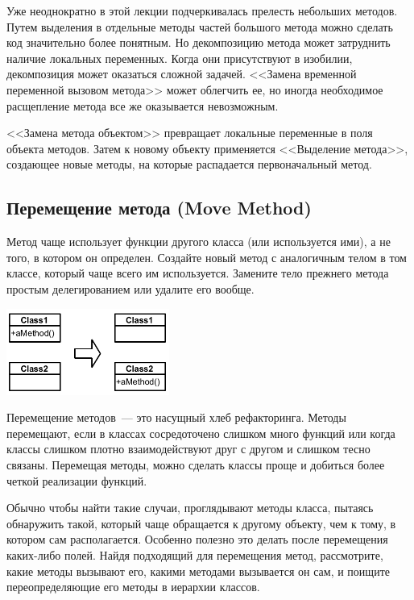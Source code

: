 \documentclass{../../text-style}
\begin{document}
Уже неоднократно в этой лекции подчеркивалась прелесть небольших методов. Путем выделения в отдельные методы частей большого метода можно сделать код значительно более понятным. Но декомпозицию метода может затруднить наличие локальных переменных. Когда они присутствуют в изобилии, декомпозиция может оказаться сложной задачей. <<Замена временной переменной вызовом метода>> может облегчить ее, но иногда необходимое расщепление метода все же оказывается невозможным.

<<Замена метода объектом>> превращает локальные переменные в поля объекта методов. Затем к новому объекту применяется <<Выделение метода>>, создающее новые методы, на которые распадается первоначальный метод.

\subsection{Перемещение метода (Move Method)}

Метод чаще использует функции другого класса (или используется ими), а не того, в котором он определен. Создайте новый метод с аналогичным телом в том классе, который чаще всего им используется. Замените тело прежнего метода простым делегированием или удалите его вообще.

\begin{center}
    \includegraphics[width=0.4\textwidth]{moveMethod.png}
\end{center}

Перемещение методов~--- это насущный хлеб рефакторинга. Методы перемещают, если в классах сосредоточено слишком много функций или когда классы слишком плотно взаимодействуют друг с другом и слишком тесно связаны. Перемещая методы, можно сделать классы проще и добиться более четкой реализации функций. 

Обычно чтобы найти такие случаи, проглядывают методы класса, пытаясь обнаружить такой, который чаще обращается к другому объекту, чем к тому, в котором сам располагается. Особенно полезно это делать после перемещения каких-либо полей. Найдя подходящий для перемещения метод, рассмотрите, какие методы вызывают его, какими методами вызывается он сам, и поищите переопределяющие его методы в иерархии классов. 
\end{document}
